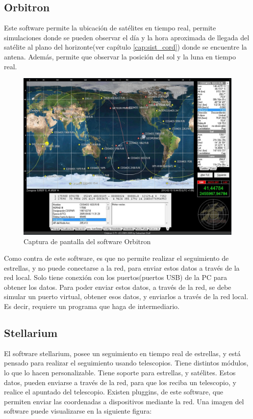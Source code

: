 \subsection{Orbitron}
Este software permite la ubicación de satélites en tiempo real, permite simulaciones donde se pueden observar el día y la hora aproximada de llegada del satélite al plano del horizonte(ver capítulo \ref{cap:sist_cord}) donde se encuentre la antena. 
Además, permite que observar la posición del sol y la luna en tiempo real. 

\begin{figure}[ht]
	\centering
	\includegraphics[scale=0.4]{orbitron}
	\caption{Captura de pantalla del software Orbitron }
\end{figure}

Como contra de este software, es que no permite realizar el seguimiento de estrellas, y no puede conectarse a la red, para enviar estos datos a través de la red local. Solo tiene conexión con los puertos(puertos USB) de la PC para obtener los datos. Para poder enviar estos datos, a través de la red, se debe simular un puerto virtual, obtener esos datos, y enviarlos a través de la red local. Es decir, requiere un programa que haga de intermediario. 

\subsection{Stellarium} 
El software stellarium, posee un seguimiento en tiempo real de estrellas, y está pensado para realizar el seguimiento usando telescopios. Tiene distintos módulos, lo que lo hacen personalizable. Tiene soporte para estrellas, y satélites. Estos datos, pueden enviarse a través de la red, para que los reciba un telescopio, y realice el apuntado del telescopio. Existen pluggins, de este software, que permiten enviar las coordenadas a dispositivos mediante la red. Una imagen del software puede visualizarse en la siguiente figura:%

